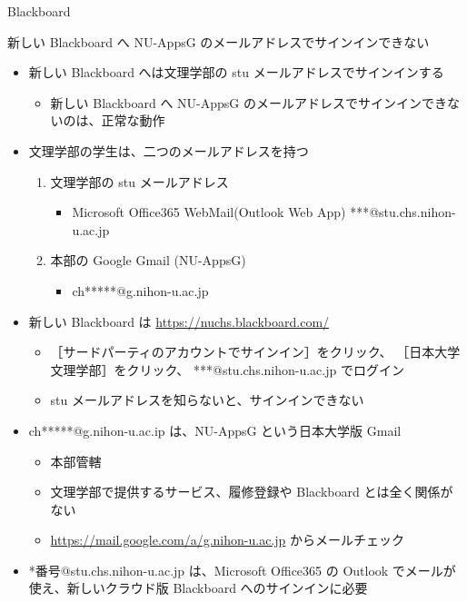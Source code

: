 \documentclass[a4j,10pt]{jsarticle}
\begin{document}
{\begin{frame}[label={sec:orgc119bb0},fragile]{Blackboard}
\begin{block}{新しい Blackboard へ NU-AppsG のメールアドレスでサインインできない}
\par
\begin{itemize}
\item 新しい Blackboard へは文理学部の stu メールアドレスでサインインする
\begin{itemize}
\item 新しい Blackboard へ NU-AppsG のメールアドレスでサインインできないのは、正常な動作
\end{itemize}
\par
\item 文理学部の学生は、二つのメールアドレスを持つ
\begin{enumerate}
\item 文理学部の stu メールアドレス
\begin{itemize}
\item Microsoft Office365 WebMail(Outlook Web App) ***@stu.chs.nihon-u.ac.jp
\end{itemize}
\item 本部の Google Gmail (NU-AppsG)
\begin{itemize}
\item ch*****@g.nihon-u.ac.jp
\end{itemize}
\end{enumerate}
\par
\item 新しい Blackboard は \url{https://nuchs.blackboard.com/}
\begin{itemize}
\item ［サードパーティのアカウントでサインイン］をクリック、 ［日本大学文理学部］をクリック、 ***@stu.chs.nihon-u.ac.jp でログイン
\item stu メールアドレスを知らないと、サインインできない
\end{itemize}
\end{itemize}
\par
\begin{itemize}
\item ch*****@g.nihon-u.ac.ip は、NU-AppsG という日本大学版 Gmail
\begin{itemize}
\item 本部管轄
\item 文理学部で提供するサービス、履修登録や Blackboard とは全く関係がない
\item \url{https://mail.google.com/a/g.nihon-u.ac.jp} からメールチェック
\end{itemize}
\par
\item *番号@stu.chs.nihon-u.ac.jp は、Microsoft Office365 の Outlook でメールが使え、新しいクラウド版 Blackboard へのサインインに必要

\end{itemize}
\end{block}
\end{frame}}
\end{document}
